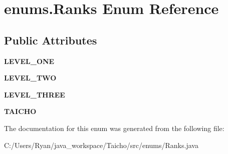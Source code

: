 \hypertarget{enumenums_1_1_ranks}{\section{enums.\-Ranks Enum Reference}
\label{enumenums_1_1_ranks}
}
\subsection*{Public Attributes}
\begin{DoxyCompactItemize}
\item 
\hypertarget{enumenums_1_1_ranks_a36cfd59172011f466a635e9a8a4708a3}{{\bfseries L\-E\-V\-E\-L\-\_\-\-O\-N\-E}}\label{enumenums_1_1_ranks_a36cfd59172011f466a635e9a8a4708a3}

\item 
\hypertarget{enumenums_1_1_ranks_ad1f209a9e79076e8022f44fad5dfcd4c}{{\bfseries L\-E\-V\-E\-L\-\_\-\-T\-W\-O}}\label{enumenums_1_1_ranks_ad1f209a9e79076e8022f44fad5dfcd4c}

\item 
\hypertarget{enumenums_1_1_ranks_aaf0d09cdd9375d4c6ce84d300029682b}{{\bfseries L\-E\-V\-E\-L\-\_\-\-T\-H\-R\-E\-E}}\label{enumenums_1_1_ranks_aaf0d09cdd9375d4c6ce84d300029682b}

\item 
\hypertarget{enumenums_1_1_ranks_ab14e3df7003c2b624eaaf29a882f322b}{{\bfseries T\-A\-I\-C\-H\-O}}\label{enumenums_1_1_ranks_ab14e3df7003c2b624eaaf29a882f322b}

\end{DoxyCompactItemize}


The documentation for this enum was generated from the following file\-:\begin{DoxyCompactItemize}
\item 
C\-:/\-Users/\-Ryan/java\-\_\-workspace/\-Taicho/src/enums/Ranks.\-java\end{DoxyCompactItemize}
